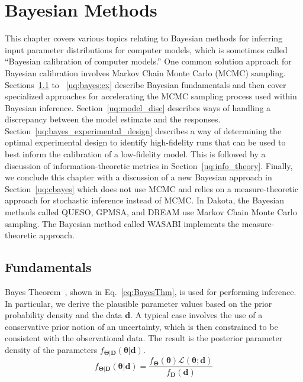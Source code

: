 \chapter{Bayesian Methods}\label{uq:bayes}


This chapter covers various topics relating to Bayesian methods for inferring input parameter distributions 
for computer models, which is sometimes called ``Bayesian calibration 
of computer models.''  One common solution approach for Bayesian calibration involves Markov Chain Monte Carlo (MCMC) 
sampling.  Sections~\ref{uq:bayes:basic} to ~\ref{uq:bayes:ex} describe Bayesian fundamentals and then cover 
specialized approaches for accelerating the MCMC sampling process used within Bayesian inference.
Section~\ref{uq:model_disc} describes ways of handling a discrepancy between the model estimate and the responses. 
Section~\ref{uq:bayes_experimental_design} describes a way of determining the optimal experimental design to
identify high-fidelity runs that can be used to best inform the calibration of a low-fidelity model. 
This is followed by a discussion of information-theoretic metrics in Section~\ref{uq:info_theory}.  
Finally, we conclude this chapter with a discussion of a new Bayesian approach in Section~\ref{uq:cbayes} 
which does not use MCMC and relies on a measure-theoretic approach for stochastic inference instead of MCMC.
In Dakota, the Bayesian methods called QUESO, GPMSA, and DREAM use Markov Chain Monte Carlo sampling. 
The Bayesian method called WASABI implements the measure-theoretic approach. 

\section{Fundamentals} \label{uq:bayes:basic}

Bayes Theorem~\cite{Jaynes}, shown in Eq.~\ref{eq:BayesThm}, is used
for performing inference.  In particular, we derive the plausible
parameter values based on the prior probability density and the data
$\boldsymbol{d}$. A typical case involves the use of a conservative prior notion of
an uncertainty, which is then constrained to be consistent with the
observational data.  The result is the posterior parameter density of
the parameters $f_{\boldsymbol{\Theta |D}}\left( \boldsymbol{\theta |d} \right)$.
\begin{equation}
{f_{\boldsymbol{\Theta |D}}}\left( \boldsymbol{\theta |d} \right) = \frac{{{f_{\boldsymbol{\Theta}}}\left( \boldsymbol{\theta}  \right)\mathcal{L}\left( \boldsymbol{\theta;d} \right)}}{{{f_{\boldsymbol{D}}}\left( \boldsymbol{d} \right)}} \label{eq:BayesThm}
\end{equation}

